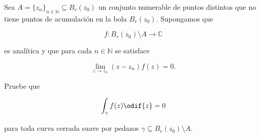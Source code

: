 \documentclass[../main.tex]{subfiles}
\begin{document}
\begin{problema}
    Sea \(A = \{z_{n}\}_{n\in \mathbb{N}} \subseteq B_{r}(z_{0})\) un conjunto
    numerable de puntos distintos que no tiene puntos de acumulación en la bola
    \(B_{r}(z_{0})\). Supongamos que

    \begin{equation*}
        f \colon B_{r}(z_{0})\setminus A \to \mathbb{C}
    \end{equation*}

    es analítica y que para cada \(n\in \mathbb{N}\) se satisface

    \begin{equation*}
        \lim_{z \to z_{n}} (z - z_{n})f(z) = 0.
    \end{equation*}

    Pruebe que

    \begin{equation*}
        \int_{\gamma}^{}f(z)\odif{z} = 0
    \end{equation*}

    para toda curva cerrada suave por pedazos \(\gamma \subseteq
    B_{r}(z_{0})\setminus A\).
\end{problema}
\end{document}
